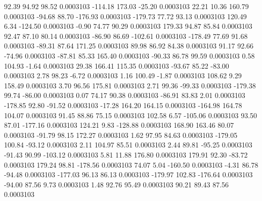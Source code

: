        92.39       94.92       98.52     0.0003103
     -114.18      173.03      -25.20     0.0003103
       22.21       10.36      160.79     0.0003103
      -94.68       88.70     -176.93     0.0003103
     -179.73       77.72       93.13     0.0003103
      120.49        6.34     -124.50     0.0003103
       -0.90       74.77       90.29     0.0003103
      179.33       94.87       85.84     0.0003103
       92.47       87.10       80.14     0.0003103
      -86.90       86.69     -102.61     0.0003103
     -178.49       77.69       91.68     0.0003103
      -89.31       87.64      171.25     0.0003103
       89.98       86.92       84.38     0.0003103
       91.17       92.66      -74.96     0.0003103
      -87.81       85.33      165.40     0.0003103
      -90.33       86.78       99.59     0.0003103
        0.58      104.93       -1.64     0.0003103
       29.38      166.41      115.35     0.0003103
      -93.67       85.22      -83.00     0.0003103
        2.78       98.23       -6.72     0.0003103
        1.16      100.49       -1.87     0.0003103
      108.62        9.29      158.49     0.0003103
        3.70       96.56      175.81     0.0003103
        2.71       99.36      -99.33     0.0003103
     -179.38       99.74      -86.00     0.0003103
        0.07       74.17       90.38     0.0003103
      -86.91       83.83        2.01     0.0003103
     -178.85       92.80      -91.52     0.0003103
      -17.28      164.20      164.15     0.0003103
     -164.98      164.78      104.07     0.0003103
       91.45       88.86       75.15     0.0003103
      102.58        6.57     -105.06     0.0003103
       93.50       87.01     -177.16     0.0003103
      124.21        9.83     -128.88     0.0003103
      168.90      163.46       80.07     0.0003103
      -91.79       98.15      172.27     0.0003103
        1.62       97.95       84.63     0.0003103
     -179.05      100.84      -93.12     0.0003103
        2.11      104.97       85.51     0.0003103
        2.44       89.81      -95.25     0.0003103
      -91.43       90.99     -103.12     0.0003103
        5.81       11.88      176.80     0.0003103
      179.91       92.30      -83.72     0.0003103
      179.24       98.81     -178.56     0.0003103
       74.07        5.04     -160.50     0.0003103
       -4.31       86.78      -94.48     0.0003103
     -177.03       96.13       86.13     0.0003103
     -179.97      102.83     -176.64     0.0003103
      -94.00       87.56        9.73     0.0003103
        1.48       92.76       95.49     0.0003103
       90.21       89.43       87.56     0.0003103
